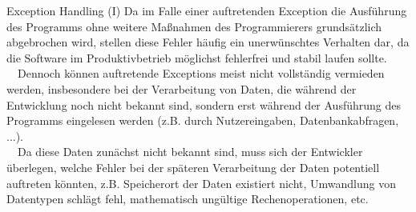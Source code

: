     
    \begin{frame}[fragile]{Exception Handling (I)}
        Da im Falle einer auftretenden Exception die Ausführung des Programms ohne weitere Maßnahmen des Programmierers grundsätzlich abgebrochen wird, stellen diese Fehler häufig ein unerwünschtes Verhalten dar, da die Software im Produktivbetrieb möglichst fehlerfrei und stabil laufen sollte.\\~\ 
        Dennoch können auftretende Exceptions meist nicht vollständig vermieden werden, insbesondere bei der Verarbeitung von Daten, die während der Entwicklung noch nicht bekannt sind, sondern erst während der Ausführung des Programms eingelesen werden (z.B. durch Nutzereingaben, Datenbankabfragen, ...).\\~\
        Da diese Daten zunächst nicht bekannt sind, muss sich der Entwickler überlegen, welche Fehler bei der späteren Verarbeitung der Daten potentiell auftreten könnten, z.B. Speicherort der Daten existiert nicht, Umwandlung von Datentypen schlägt fehl, mathematisch ungültige Rechenoperationen, etc.
    \end{frame}
    
